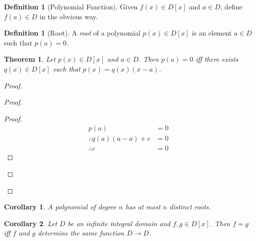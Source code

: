 \documentclass{article}
\let\qed\relax
\newtheorem{theorem}[axiom]{Theorem}
\newtheorem{corollary}{Corollary}[axiom]
\theoremstyle{definition}
\newtheorem{definition}[axiom]{Definition}
\begin{document}
    \begin{definition}[Polynomial Function]
        Given $f(x) \in D[x]$ and $a \in D$, define $f(a) \in D$ in the obvious way.
    \end{definition}

    \begin{definition}[Root]
        A \emph{root} of a polynomial $p(x) \in D[x]$ is an element $a \in D$ such that $p(a) = 0$.
    \end{definition}

    \begin{theorem}
        Let $p(x) \in D[x]$ and $a \in D$. Then $p(a) = 0$ iff there exists $q(x) \in D[x]$ such that
        $p(x) = q(x) (x - a)$.
    \end{theorem}

    \begin{proof}
        \pf
        \begin{proof}
            \begin{proof}
                \pf
                \begin{align*}
                    p(a) & = 0 \\
                    \therefore q(a)(a-a) + c & = 0 \\
                    \therefore c & = 0
                \end{align*}
            \end{proof}
        \end{proof}
        \qed
    \end{proof}

    \begin{corollary}
        A polynomial of degree $n$ has at most $n$ distinct roots.
    \end{corollary}

    \begin{corollary}
        Let $D$ be an infinite integral domain and $f, g \in D[x]$. Then $f = g$ iff $f$ and $g$ determine
        the same function $D \rightarrow D$.
    \end{corollary}
\end{document}

